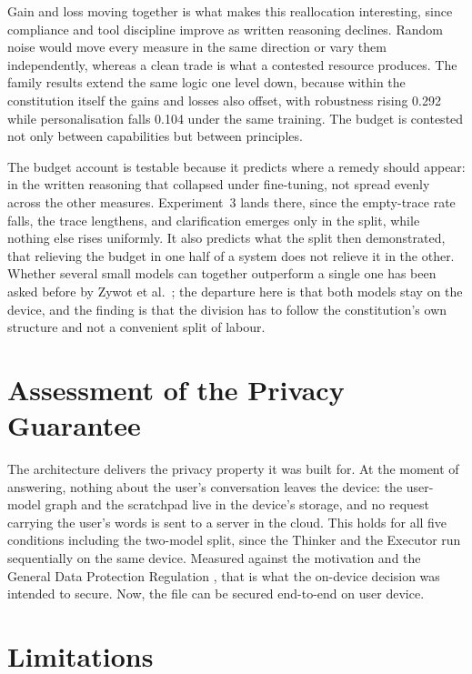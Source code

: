 Gain and loss moving together is what makes this reallocation interesting, since compliance and tool discipline improve as written reasoning declines. Random noise would move every measure in the same direction or vary them independently, whereas a clean trade is what a contested resource produces. The family results extend the same logic one level down, because within the constitution itself the gains and losses also offset, with robustness rising 0.292 while personalisation falls 0.104 under the same training. The budget is contested not only between capabilities but between principles.

The budget account is testable because it predicts where a remedy should appear: in the written reasoning that collapsed under fine-tuning, not spread evenly across the other measures. Experiment~3 lands there, since the empty-trace rate falls, the trace lengthens, and clarification emerges only in the split, while nothing else rises uniformly. It also predicts what the split then demonstrated, that relieving the budget in one half of a system does not relieve it in the other. Whether several small models can together outperform a single one has been asked before by Zywot et al.\ \cite{zywot2026smallagentscollaboratebeat}; the departure here is that both models stay on the device, and the finding is that the division has to follow the constitution's own structure and not a convenient split of labour.

\section{Assessment of the Privacy Guarantee}
\label{sec:privacy-preserving-ai}

The architecture delivers the privacy property it was built for. At the moment of answering, nothing about the user's conversation leaves the device: the user-model graph and the scratchpad live in the device's storage, and no request carrying the user's words is sent to a server in the cloud. This holds for all five conditions including the two-model split, since the Thinker and the Executor run sequentially on the same device. Measured against the motivation and the General Data Protection Regulation \cite{gdpr2016}, that is what the on-device decision was intended to secure. Now, the file can be secured end-to-end on user device.

\section{Limitations}
\label{sec:limitations}

